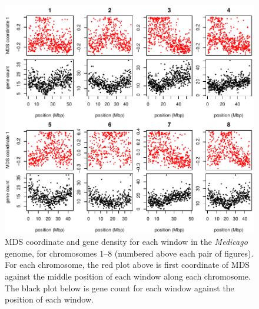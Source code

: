 \documentclass[11pt, oneside]{article}   	%
\begin{document}
\begin{figure}
    \begin{center}
       \includegraphics{Fig5_MDS_and_gene_count_allchr_update_correction}
    \end{center}
    \caption{
         MDS coordinate and gene density for each window in the \textit{Medicago} genome,
         for chromosomes 1--8 (numbered above each pair of figures).
         For each chromosome, the red plot above is first coordinate of MDS against the middle position of each window along each chromosome. 
         The black plot below is gene count for each window against the position of each window.
         \label{fig:mds_medicago}
    }
\end{figure}
\end{document}
